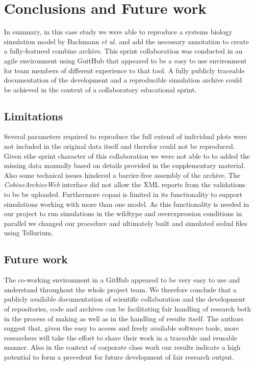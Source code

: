 \section*{Conclusions and Future work}

In summary, in this case study we were able to reproduce a systems biology simulation model by Bachmann \textit{et al.} \cite{bachmannmodel} and add the necessary annotation to create a fully-featured \ac{combine} archive. This sprint collaboration was conducted in an agile environment using GuitHub that appeared to be a easy to use environment for team members of different experience to that tool. A fully publicly traceable documentation of the development and a reproducible simulation archive could be achieved in the context of a collaboratory educational sprint.


\subsection*{Limitations}
Several parameters required to reproduce the full extend of individual plots were not included in the original data itself and therefor could not be reproduced.  Given sthe sprint character of this collaboration we were not able to to added the missing data manually based on details provided in the supplementary material. 
Also some technical issues hindered a barrier-free assembly of the archive. The \textit{CobineArchiveWeb} interface did not allow the XML reports from the validations to be be uploaded. Furthermore \ac{copasi} is limited in its functionality to support simulations working with more than one model. As this functionality is needed in our project to run simulations in the wildtype and overexpression conditions in parallel we changed our procedure and ultimately built and simulated \ac{sedml} files using Tellurium.


\subsection*{Future work}
The co-working environment in a GitHub appeared to be very easy to use and understand throughout the whole project team. We therefore conclude that a publicly available documentation of scientific collaboration and the development of repositories, code and archives can be facilitating \ac{fair} handling of research both in the process of making as well as in the handling of results itself.
The authors suggest that, given the easy to access and freely available software tools, more researchers will take the effort to share their work in a traceable and reusable manner. Also in the context of corporate class work our results indicate a high potential to form a precedent for future development of \ac{fair} research output.
\pagebreak